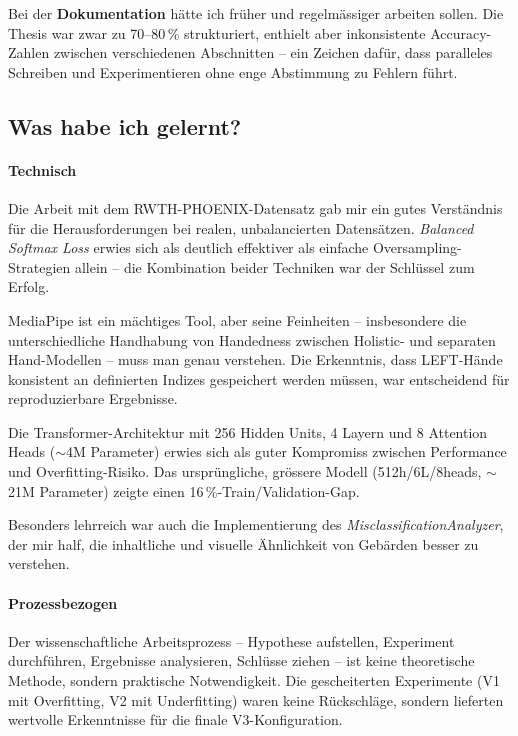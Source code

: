 Bei der \textbf{Dokumentation} hätte ich früher und regelmässiger arbeiten sollen. Die Thesis war zwar zu 70--80\,\% strukturiert, enthielt aber inkonsistente Accuracy-Zahlen zwischen verschiedenen Abschnitten -- ein Zeichen dafür, dass paralleles Schreiben und Experimentieren ohne enge Abstimmung zu Fehlern führt.

\subsection{Was habe ich gelernt?}

\paragraph{Technisch}
Die Arbeit mit dem RWTH-PHOENIX-Datensatz gab mir ein gutes Verständnis für die Herausforderungen bei realen, unbalancierten Datensätzen. \textit{Balanced Softmax Loss} erwies sich als deutlich effektiver als einfache Oversampling-Strategien allein -- die Kombination beider Techniken war der Schlüssel zum Erfolg.

MediaPipe ist ein mächtiges Tool, aber seine Feinheiten -- insbesondere die unterschiedliche Handhabung von Handedness zwischen Holistic- und separaten Hand-Modellen -- muss man genau verstehen. Die Erkenntnis, dass LEFT-Hände konsistent an definierten Indizes gespeichert werden müssen, war entscheidend für reproduzierbare Ergebnisse.

Die Transformer-Architektur mit 256 Hidden Units, 4 Layern und 8 Attention Heads ($\sim$4M Parameter) erwies sich als guter Kompromiss zwischen Performance und Overfitting-Risiko. Das ursprüngliche, grössere Modell (512h/6L/8heads, $\sim$21M Parameter) zeigte einen 16\,\%-Train/Validation-Gap.

Besonders lehrreich war auch die Implementierung des \textit{MisclassificationAnalyzer}, der mir half, die inhaltliche und visuelle Ähnlichkeit von Gebärden besser zu verstehen.

\paragraph{Prozessbezogen}
Der wissenschaftliche Arbeitsprozess -- Hypothese aufstellen, Experiment durchführen, Ergebnisse analysieren, Schlüsse ziehen -- ist keine theoretische Methode, sondern praktische Notwendigkeit. Die \glqq gescheiterten\grqq{} Experimente (V1 mit Overfitting, V2 mit Underfitting) waren keine Rückschläge, sondern lieferten wertvolle Erkenntnisse für die finale V3-Konfiguration.


